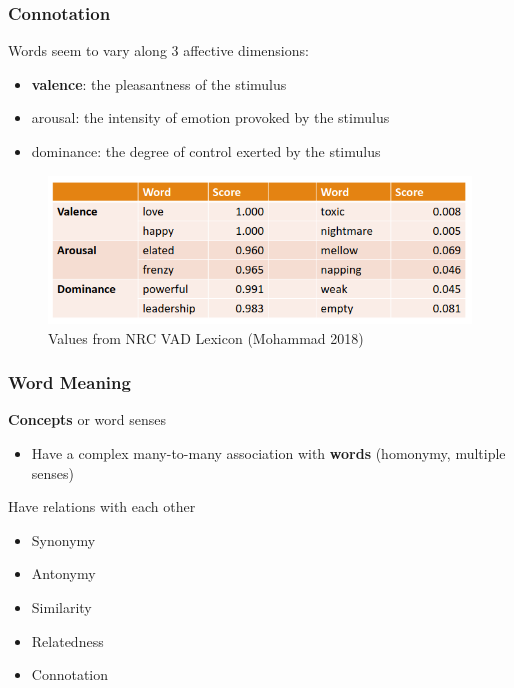 \documentclass[13.5pt,aspecratio=169, xcolor=dvipsnames]{beamer}
\begin{document}
\begin{frame}
    \onehalfspacing
        \frametitle{Connotation}
        \begin{block}{Words seem to vary along 3 affective dimensions:}
            \begin{itemize}
                \item \textbf{valence}: the pleasantness of the stimulus
                \item arousal: the intensity of emotion provoked by the stimulus
                \item dominance: the degree of control exerted by the stimulus
            \end{itemize}
        \end{block}

        \begin{figure}[h]
            \centering
            \includegraphics[width=\linewidth]{Antonymy.png}
            \captionsetup{labelformat=empty}
            \caption{Values from NRC VAD Lexicon (Mohammad 2018)}
        \end{figure}
    \end{frame}
   
    \begin{frame}
        \onehalfspacing
            \frametitle{Word Meaning}
            {\Large
            \textbf{Concepts} or word senses
            \begin{itemize}
                \item Have a complex many-to-many association with \textbf{words} (homonymy,
                multiple senses)
            \end{itemize}
            Have relations with each other
                \begin{itemize}
                    \item Synonymy
                    \item Antonymy
                    \item Similarity
                    \item Relatedness
                    \item Connotation
                \end{itemize} }
        \end{frame}
\end{document}
